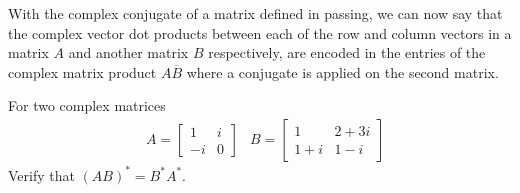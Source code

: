 With the complex conjugate of a matrix defined in passing, we can now say that the complex vector dot products between each of the row and column vectors in a matrix $A$ and another matrix $B$ respectively, are encoded in the entries of the complex matrix product $A\overline{B}$ where a conjugate is applied on the second matrix.
\begin{exmp}
For two complex matrices
\begin{align*}
& A =
\begin{bmatrix}
1 & i \\
-i & 0
\end{bmatrix} 
& B =
\begin{bmatrix}
1 & 2+3i \\
1+i & 1-i
\end{bmatrix}
\end{align*}
Verify that $(AB)^* = B^*A^*$.
\end{exmp}
